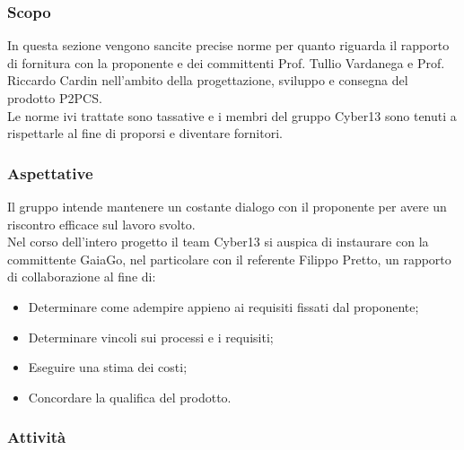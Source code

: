 \subsubsection{Scopo}
In  questa  sezione  vengono sancite precise norme per quanto riguarda il rapporto di fornitura con la proponente  e  dei committenti  Prof. Tullio Vardanega e Prof. Riccardo Cardin nell’ambito della progettazione, sviluppo e consegna del prodotto P2PCS. \\
Le norme  ivi trattate sono tassative e i membri del gruppo Cyber13  sono tenuti a rispettarle al fine di proporsi e diventare fornitori.

\subsubsection{Aspettative}
Il gruppo intende mantenere un costante dialogo con il proponente per avere un riscontro efficace sul lavoro svolto.\\
Nel corso dell'intero progetto il team Cyber13 si auspica di instaurare con la committente GaiaGo, nel particolare con il referente Filippo Pretto, un rapporto di collaborazione al fine di:
    \begin{itemize}
        \item Determinare come adempire appieno ai requisiti fissati dal proponente;
        \item Determinare vincoli sui processi e i requisiti;
        \item Eseguire una stima dei costi;
        \item Concordare la qualifica del prodotto.
    \end{itemize}


\subsubsection{Attività}
